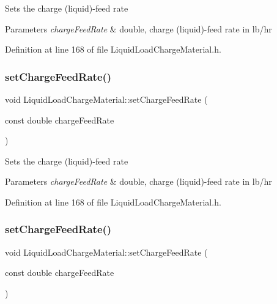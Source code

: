 Sets the charge (liquid)-\/feed rate 
\begin{DoxyParams}{Parameters}
{\em charge\+Feed\+Rate} & double, charge (liquid)-\/feed rate in lb/hr \\
\hline
\end{DoxyParams}


Definition at line 168 of file Liquid\+Load\+Charge\+Material.\+h.

\mbox{\label{class_liquid_load_charge_material_a23d6aa6f15a124ddb1504261347b0b82}} 
\subsubsection{\texorpdfstring{set\+Charge\+Feed\+Rate()}{setChargeFeedRate()}\hspace{0.1cm}{\footnotesize\ttfamily [2/3]}}
{\footnotesize\ttfamily void Liquid\+Load\+Charge\+Material\+::set\+Charge\+Feed\+Rate (\begin{DoxyParamCaption}\item[{const double}]{charge\+Feed\+Rate }\end{DoxyParamCaption})\hspace{0.3cm}{\ttfamily [inline]}}

Sets the charge (liquid)-\/feed rate 
\begin{DoxyParams}{Parameters}
{\em charge\+Feed\+Rate} & double, charge (liquid)-\/feed rate in lb/hr \\
\hline
\end{DoxyParams}


Definition at line 168 of file Liquid\+Load\+Charge\+Material.\+h.

\mbox{\label{class_liquid_load_charge_material_a23d6aa6f15a124ddb1504261347b0b82}} 
\subsubsection{\texorpdfstring{set\+Charge\+Feed\+Rate()}{setChargeFeedRate()}\hspace{0.1cm}{\footnotesize\ttfamily [3/3]}}
{\footnotesize\ttfamily void Liquid\+Load\+Charge\+Material\+::set\+Charge\+Feed\+Rate (\begin{DoxyParamCaption}\item[{const double}]{charge\+Feed\+Rate }\end{DoxyParamCaption})\hspace{0.3cm}{\ttfamily [inline]}}

